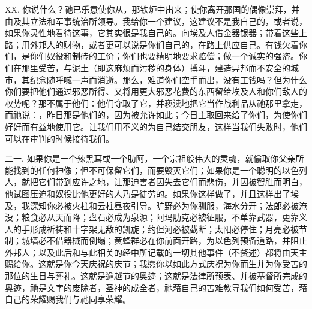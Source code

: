 XX. 你说什么？祂已乐意使你从，那铁炉中出来；使你离开那国的偶像崇拜，并由及其立法和军事统治所领导。我给你一个建议，这建议不是我自己的，或者说，如果你灵性地看待这事，它其实很是我自己的。向埃及人借金器银器；带着这些上路；用外邦人的财物，或者更可以说是你们自己的，在路上供应自己。有钱欠着你们，是你们奴役和制砖的工价；你们也要精明地要求赔偿；做一个诚实的强盗。你们在那里受苦，与泥土（即这麻烦而污秽的身体）搏斗，建造异邦而不安全的城市，其纪念随呼喊一声而消逝。那么，难道你们空手而出，没有工钱吗？但为什么你们要把他们通过邪恶所得、又将用更大邪恶花费的东西留给埃及人和你们敌人的权势呢？那不属于他们：他们夺取了它，并亵渎地把它当作战利品从祂那里拿走，而祂说：，昨日那是他们的，因为被允许如此；今日主取回来给了你们，为使你们好好而有益地使用它。让我们用不义的为自己结交朋友，这样当我们失败时，他们可以在审判的时候接待我们。\par

二一. 如果你是一个辣黑耳或一个肋阿，一个宗祖般伟大的灵魂，就偷取你父亲所能找到的任何神像；但不可保留它们，而要毁灭它们；如果你是一个聪明的以色列人，就把它们带到应许之地，让那迫害者因失去它们而悲伤，并因被智胜而明白，他试图压迫和奴役比他更好的人乃是徒劳的。如果你这样做了，并且这样出了埃及，我深知你必被火柱和云柱昼夜引导。旷野必为你驯服，海水分开；法郎必被淹没；粮食必从天而降；盘石必成为泉源；阿玛肋克必被征服，不单靠武器，更靠义人的手形成祈祷和十字架无敌的凯旋；约但河必被截断；太阳必停住；月亮必被节制；城墙必不借器械而倒塌；黄蜂群必在你前面开路，为以色列预备道路，并阻止外邦人；以及此后和与此相关的经中所记载的一切其他事件（不赘述）都将由天主赐给你。这就是你今天庆祝的庆节；我愿你以如此方式庆祝为你而生并为你受苦的那位的生日与葬礼。这就是逾越节的奥迹；这就是法律所预表、并被基督所完成的奥迹，祂是文字的废除者，圣神的成全者，祂藉自己的苦难教导我们如何受苦，藉自己的荣耀赐我们与祂同享荣耀。\par

